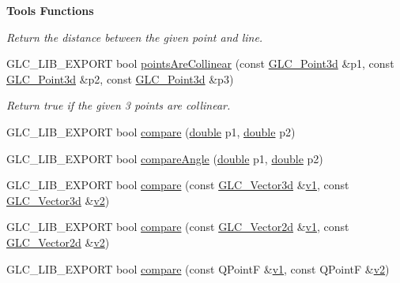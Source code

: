 \begin{Indent}{\bf Tools Functions}
\begin{DoxyCompactItemize}
\begin{DoxyCompactList}\small\item\em Return the distance between the given point and line. \end{DoxyCompactList}\item 
G\-L\-C\-\_\-\-L\-I\-B\-\_\-\-E\-X\-P\-O\-R\-T bool \hyperlink{namespaceglc_afdaec36bd6864a3d38e7624e59f1f8ed}{points\-Are\-Collinear} (const \hyperlink{glc__vector3d_8h_a4e13a9bbc7ab3d34de7e98b41836772c}{G\-L\-C\-\_\-\-Point3d} \&p1, const \hyperlink{glc__vector3d_8h_a4e13a9bbc7ab3d34de7e98b41836772c}{G\-L\-C\-\_\-\-Point3d} \&p2, const \hyperlink{glc__vector3d_8h_a4e13a9bbc7ab3d34de7e98b41836772c}{G\-L\-C\-\_\-\-Point3d} \&p3)
\begin{DoxyCompactList}\small\item\em Return true if the given 3 points are collinear. \end{DoxyCompactList}\item 
G\-L\-C\-\_\-\-L\-I\-B\-\_\-\-E\-X\-P\-O\-R\-T bool \hyperlink{namespaceglc_aacca942c010a41e3920a354c8ff53bfd}{compare} (\hyperlink{_super_l_u_support_8h_a8956b2b9f49bf918deed98379d159ca7}{double} p1, \hyperlink{_super_l_u_support_8h_a8956b2b9f49bf918deed98379d159ca7}{double} p2)
\item 
G\-L\-C\-\_\-\-L\-I\-B\-\_\-\-E\-X\-P\-O\-R\-T bool \hyperlink{namespaceglc_a25462e4c2e39b61c2e8affe9558610dc}{compare\-Angle} (\hyperlink{_super_l_u_support_8h_a8956b2b9f49bf918deed98379d159ca7}{double} p1, \hyperlink{_super_l_u_support_8h_a8956b2b9f49bf918deed98379d159ca7}{double} p2)
\item 
G\-L\-C\-\_\-\-L\-I\-B\-\_\-\-E\-X\-P\-O\-R\-T bool \hyperlink{namespaceglc_a1be487b7b6c813452292cecdad56ae16}{compare} (const \hyperlink{class_g_l_c___vector3d}{G\-L\-C\-\_\-\-Vector3d} \&\hyperlink{glext_8h_aabdd9aabede45fcf97cea04f88d2ad60}{v1}, const \hyperlink{class_g_l_c___vector3d}{G\-L\-C\-\_\-\-Vector3d} \&\hyperlink{glext_8h_ae35401c8c2fcdcc48c20ba325ee473ea}{v2})
\item 
G\-L\-C\-\_\-\-L\-I\-B\-\_\-\-E\-X\-P\-O\-R\-T bool \hyperlink{namespaceglc_a7945a8843feebddbe9bdced2138db25a}{compare} (const \hyperlink{class_g_l_c___vector2d}{G\-L\-C\-\_\-\-Vector2d} \&\hyperlink{glext_8h_aabdd9aabede45fcf97cea04f88d2ad60}{v1}, const \hyperlink{class_g_l_c___vector2d}{G\-L\-C\-\_\-\-Vector2d} \&\hyperlink{glext_8h_ae35401c8c2fcdcc48c20ba325ee473ea}{v2})
\item 
G\-L\-C\-\_\-\-L\-I\-B\-\_\-\-E\-X\-P\-O\-R\-T bool \hyperlink{namespaceglc_ac6b207ca6cf047ee0020195dc388f082}{compare} (const Q\-Point\-F \&\hyperlink{glext_8h_aabdd9aabede45fcf97cea04f88d2ad60}{v1}, const Q\-Point\-F \&\hyperlink{glext_8h_ae35401c8c2fcdcc48c20ba325ee473ea}{v2})

\end{DoxyCompactItemize}
\end{Indent}
